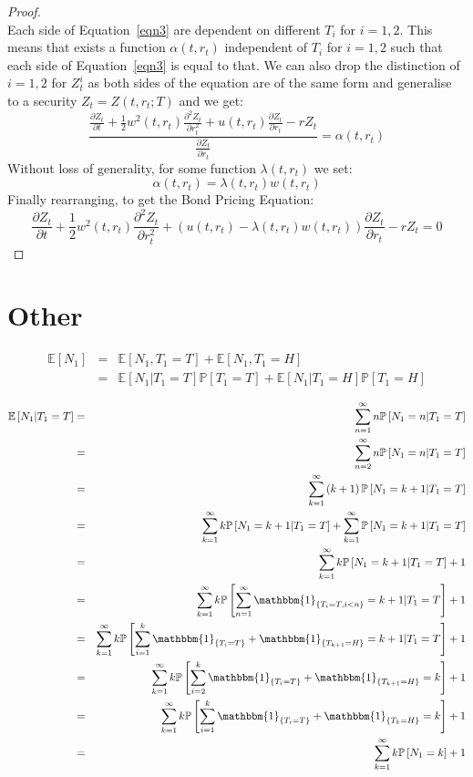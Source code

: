 \documentclass[11pt]{article}
\theoremstyle{definition}
\newcommand{\brac}[1]{\left(#1\right)}
\newcommand{\pardiff}[2]{\frac{\partial #1}{\partial #2}}
\newcommand{\E}[1]{\mathbb{E}\left[#1\right]}
\newcommand{\prob}[1]{\mathbb{P}\left[#1\right]}
\newcommand{\ind}[1]{\mathbbm{1}_{\left\{#1\right\}}}
\begin{document}
\begin{proof}
\begin{equation}
		 \end{equation} 
		Each side of Equation~\ref{eqn3} are dependent on different $T_i$ for $i=1,2$. This means that exists a function $\alpha\brac{t,r_t}$ independent of $T_i$ for $i=1,2$ such that each side of Equation~\ref{eqn3} is equal to that. We can also drop the distinction of $i=1,2$ for $Z^i_t$ as both sides of the equation are of the same form and generalise to a security $Z_t = Z\brac{t,r_t;T}$ and we get:
		$$ \frac{\pardiff{Z_t}{t}+\frac{1}{2}w^2\brac{t,r_t}\pardiff{^2Z_t}{r_t^2} + u\brac{t,r_t}\pardiff{Z_t}{r_t} - rZ_t}{\pardiff{Z_t}{r_t}} = \alpha\brac{t,r_t}  $$
		Without loss of generality, for some function $\lambda\brac{t,r_t}$ we set:
		$$\alpha\brac{t,r_t} = \lambda\brac{t,r_t}w\brac{t,r_t}$$
		Finally rearranging, to get the Bond Pricing Equation:
		$$ \pardiff{Z_t}{t}+\frac{1}{2}w^2\brac{t,r_t}\pardiff{^2Z_t}{r_t^2} + \brac{u\brac{t,r_t} - \lambda\brac{t,r_t}w\brac{t,r_t}}\pardiff{Z_t}{r_t} - rZ_t = 0 $$
	\end{proof}
	
\section{Other}
	\begin{eqnarray}
	\E{N_1} &=& \E{N_1,T_1=T} + \E{N_1,T_1=H}\\
	&=& \E{N_1|T_1=T}\prob{T_1=T} + \E{N_1|T_1=H}\prob{T_1=H}
	\end{eqnarray}
	
	\begin{eqnarray}
	\E{N_1|T_1=T} &=& \sum_{n=1}^{\infty}n\prob{N_1=n|T_1=T}\\ &=&\sum_{n=2}^{\infty}n\prob{N_1=n|T_1=T}\\
	&=&\sum_{k=1}^{\infty}\brac{k+1}\prob{N_1=k+1|T_1=T}\\
	&=&\sum_{k=1}^{\infty}k\prob{N_1=k+1|T_1=T}+\sum_{k=1}^{\infty}\prob{N_1=k+1|T_1=T}\\
	&=&\sum_{k=1}^{\infty}k\prob{N_1=k+1|T_1=T}+1\\
	&=&\sum_{k=1}^{\infty}k\prob{\sum_{n=1}^{\infty}\ind{T_i=T,i<n}=k+1|T_1=T}+1\\
	&=&\sum_{k=1}^{\infty}k\prob{\sum_{i=1}^{k}\ind{T_i=T} + \ind{T_{k+1}=H} =k+1|T_1=T}+1\\
	&=&\sum_{k=1}^{\infty}k\prob{\sum_{i=2}^{k}\ind{T_i=T} + \ind{T_{k+1}=H} =k}+1\\
	&=&\sum_{k=1}^{\infty}k\prob{\sum_{i=1}^{k}\ind{T_i=T} + \ind{T_{k}=H} =k}+1\\
	&=&\sum_{k=1}^{\infty}k\prob{N_1 =k}+1\\
	\end{eqnarray}
	
\end{document}
